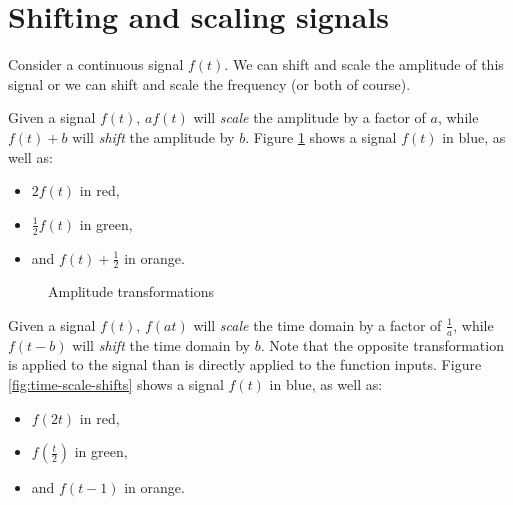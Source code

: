 \documentclass[12pt]{article}
\begin{document}
\section{Shifting and scaling signals}

Consider a continuous signal $f(t)$. We can shift and scale the amplitude of this signal or we can shift and scale the frequency (or both of course).

Given a signal $f(t)$, $af(t)$ will \emph{scale} the amplitude by a factor of $a$, while $f(t) + b$ will \emph{shift} the amplitude by $b$. Figure \ref{fig:amplitude-scale-shifts} shows a signal $f(t)$ in blue, as well as:
\begin{itemize}
    \item $2f(t)$ in red,
    \item $\frac{1}{2}f(t)$ in green,
    \item and $f(t) + \frac{1}{2}$ in orange.
\end{itemize}

\begin{figure}[ht!]
    \centering
\caption{Amplitude transformations}
\label{fig:amplitude-scale-shifts}
\end{figure}

Given a signal $f(t)$, $f(at)$ will \emph{scale} the time domain by a factor of $\frac{1}{a}$, while $f(t - b)$ will \emph{shift} the time domain by $b$. Note that the opposite transformation is applied to the signal than is directly applied to the function inputs. Figure \ref{fig:time-scale-shifts} shows a signal $f(t)$ in blue, as well as:
\begin{itemize}
    \item $f(2t)$ in red,
    \item $f(\frac{t}{2})$ in green,
    \item and $f(t - 1)$ in orange.
\end{itemize}
\end{document}

